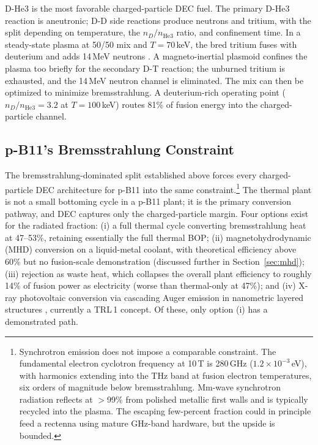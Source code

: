 \documentclass{article}
\begin{document}
D-He3 is the most favorable charged-particle DEC fuel. The primary
D-He3 reaction is aneutronic; D-D side reactions produce neutrons
and tritium, with the split depending on temperature, the
$n_D/n_{\mathrm{He3}}$ ratio, and confinement time. In a
steady-state plasma at 50/50 mix and $T = 70$\,keV, the bred
tritium fuses with deuterium and adds 14\,MeV neutrons
\citep{Wesson2004}. A
magneto-inertial plasmoid confines the plasma too briefly for the
secondary D-T reaction; the unburned tritium is exhausted, and the
14\,MeV neutron channel is eliminated. The mix can then be optimized
to minimize bremsstrahlung. A deuterium-rich operating point
($n_D/n_{\mathrm{He3}} = 3.2$ at $T = 100$\,keV) routes 81\% of
fusion energy into the charged-particle channel.

\subsection{p-B11's Bremsstrahlung Constraint}
\label{sec:brem}

The bremsstrahlung-dominated split established above forces every
charged-particle DEC architecture for p-B11 into the same
constraint.\footnote{Synchrotron emission does not impose a
comparable constraint. The fundamental electron cyclotron frequency
at 10\,T is 280\,GHz ($1.2 \times 10^{-3}$\,eV), with harmonics
extending into the THz band at fusion electron temperatures, six
orders of magnitude below bremsstrahlung. Mm-wave synchrotron
radiation reflects at $>$99\% from polished metallic first walls
and is typically recycled into the plasma. The escaping
few-percent fraction could in principle feed a rectenna using
mature GHz-band hardware, but the upside is bounded.} The thermal plant is not a small bottoming cycle in a
p-B11 plant; it is the primary conversion pathway, and DEC captures
only the charged-particle margin. Four options exist for the radiated fraction: (i) a full
thermal cycle converting bremsstrahlung heat at 47--53\%, retaining
essentially the full thermal BOP; (ii) magnetohydrodynamic (MHD)
conversion on a liquid-metal coolant, with theoretical efficiency
above 60\% but no fusion-scale demonstration \citep{Smolentsev2022}
(discussed further in Section~\ref{sec:mhd});
(iii) rejection as waste heat, which collapses the overall plant
efficiency to roughly 14\% of fusion power as electricity (worse
than thermal-only at 47\%); and (iv) X-ray photovoltaic conversion
via cascading Auger emission in nanometric layered structures
\citep{Binderbauer2018}, currently a TRL\,1 concept. Of these, only
option (i) has a demonstrated path.
\end{document}
